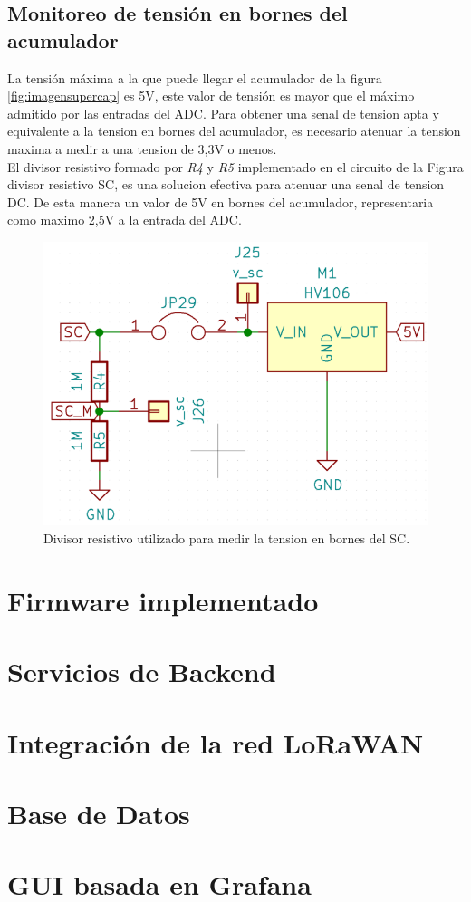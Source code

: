 \subsection{Monitoreo de tensión en bornes del acumulador}
La tensión máxima a la que puede llegar el acumulador de la figura \ref{fig:imagensupercap} es 5V, este valor de tensión es mayor que el máximo admitido por las entradas del ADC. Para obtener una senal de tension apta y equivalente a la tension en bornes del acumulador, es necesario atenuar la tension maxima a medir a una tension de 3,3V o menos.\\
El divisor resistivo formado por \textit{R4} y \textit{R5} implementado en el circuito de la Figura divisor resistivo SC, es una solucion efectiva para atenuar una senal de tension DC. De esta manera un valor de 5V en bornes del acumulador, representaria como maximo 2,5V a la entrada del ADC.\\
\begin{figure}[h!]
	\centering
	\includegraphics[width=0.7\linewidth]{Figures/cto_divisor_resistivo}
	\caption{Divisor resistivo utilizado para medir la tension en bornes del SC.}
	\label{fig:ctodivisorresistivo}
\end{figure}



\section{Firmware implementado}
\label{seccion_firmware}

\section{Servicios de Backend}
\label{seccion_bes}

\section{Integraci\'{o}n de la red LoRaWAN}

\section{Base de Datos}

\section{GUI basada en Grafana}

